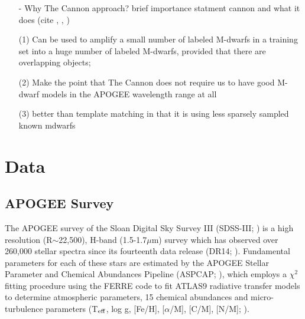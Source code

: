 \documentclass[modern]{aastex62}
\begin{document}
\begin{enumerate}
 (3) using empirical classifications/templates/standards - SPT, luminosity class - this is a relative system but does not provide an absolute standard for measuring physical parameters

\item[-] Why The Cannon approach? brief importance statment cannon and what it does (cite \citealt{Ness:2015}, \citealt{Ho:2017a}, \citealt{Casey:2016})

 (1) Can be used to amplify a small number of labeled M-dwarfs in a training set into a huge number of labeled M-dwarfs, provided that there are overlapping objects; 

 (2) Make the point that The Cannon does not require us to have good M-dwarf models in the APOGEE wavelength range at all 

 (3) better than template matching in that it is using less sparsely sampled known mdwarfs

\end{enumerate}



\section{Data} \label{sec:data}

\subsection{APOGEE Survey}


The APOGEE survey \citep{Majewski:2015} of the Sloan Digital Sky Survey III (SDSS-III; \citealt{Eisenstein:2011}) is a high resolution (R$\sim$22,500), H-band (1.5-1.7$\mu$m) survey which has observed over 260,000 stellar spectra since its fourteenth data release (DR14; \citealt{Abolfathi:2017}). Fundamental parameters for each of these stars are estimated by the APOGEE Stellar Parameter and Chemical Abundances Pipeline (ASPCAP; \citealt{Perez:2016}), which employs a $\chi^2$ fitting procedure using the FERRE code to fit ATLAS9 radiative transfer models \citep{Castelli:2004} to determine atmospheric parameters, 15 chemical abundances and micro-turbulence parameters (T$_{\rm eff}$, log g, [Fe/H], [$\alpha$/M], [C/M], [N/M]; \citealt{Meszaros:2012}). 
\end{document}
